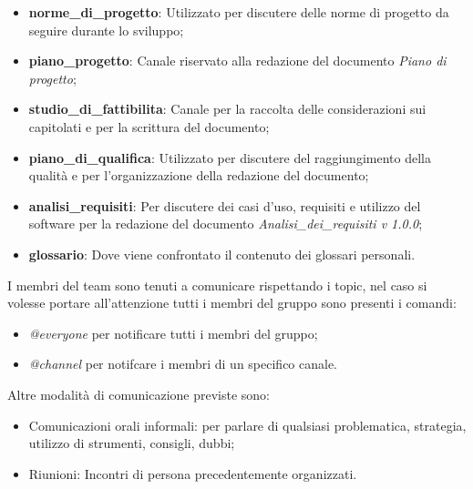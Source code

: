             \begin{itemize}
                \item \textbf{norme_di_progetto}: Utilizzato per discutere delle norme di progetto da seguire durante lo sviluppo;
                \item \textbf{piano_progetto}: Canale riservato alla redazione del documento \textit{Piano di progetto};
                \item \textbf{studio_di_fattibilita}: Canale per la raccolta delle considerazioni sui capitolati e per la scrittura del documento;
                \item \textbf{piano_di_qualifica}: Utilizzato per discutere del raggiungimento della qualità e per l'organizzazione della redazione del documento;
                \item \textbf{analisi_requisiti}: Per discutere dei casi d'uso, requisiti e utilizzo del software per la redazione del documento \textit{Analisi_dei_requisiti v 1.0.0}; 
                \item \textbf{glossario}: Dove viene confrontato il contenuto dei glossari personali.
            \end{itemize}
            \newline
            I membri del team sono tenuti a comunicare rispettando i topic, nel caso si volesse portare all'attenzione tutti i membri del gruppo sono presenti i comandi:
            \begin{itemize}
                \item \textit{@everyone} per notificare tutti i membri del gruppo;
                \item \textit{@channel} per notifcare i membri di un specifico canale.
            \end{itemize}
            
            \newline
            Altre modalità di comunicazione previste sono:
            \begin{itemize}
                \item Comunicazioni orali informali: per parlare di qualsiasi problematica, strategia, utilizzo di strumenti, consigli, dubbi;
                \item Riunioni: Incontri di persona precedentemente organizzati.
            \end{itemize}        
